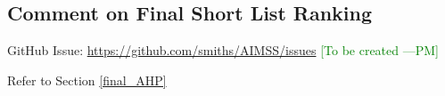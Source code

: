 \documentclass[12pt]{article}
\newcommand{\authornote}[3]{\textcolor{#1}{[#3 ---#2]}}
\newcommand{\authornote}[3]{}
\newcommand{\pmi}[1]{\authornote{green}{PM}{#1}} %
\newcommand{\ad}[1]{\authornote{brown}{AD}{#1}} %
\begin{document}
\subsection{Comment on Final Short List Ranking}
\label{task_final_ranking}
GitHub Issue:
\href{https://github.com/smiths/AIMSS/issues}{https://github.com/smiths/AIMSS/issues}
\pmi{To be created}

\noindent Refer to Section \ref{final_AHP}

%
%
%
\end{document}
